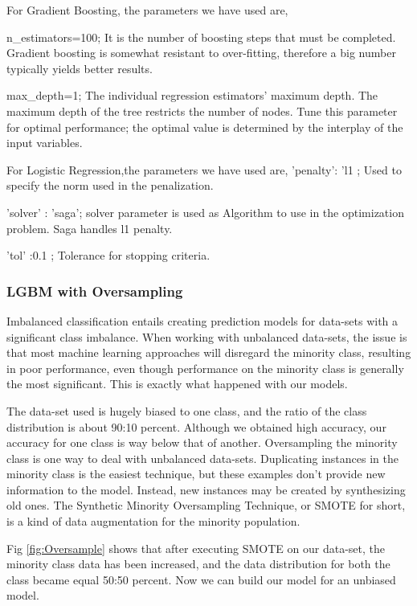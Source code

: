 \documentclass[sigconf, nonacm]{acmart}
\begin{document}
For Gradient Boosting, the parameters we have used are,

n\_estimators=100;
It is the number of boosting steps that must be completed. Gradient boosting is somewhat resistant to over-fitting, therefore a big number typically yields better results.

max\_depth=1;
The individual regression estimators' maximum depth. The maximum depth of the tree restricts the number of nodes. Tune this parameter for optimal performance; the optimal value is determined by the interplay of the input variables.

For Logistic Regression,the parameters we have used are,
'penalty': 'l1 ; Used to specify the norm used in the penalization.


'solver' : 'saga'; solver parameter is used as Algorithm to use in the optimization problem. Saga handles l1 penalty.


'tol' :0.1 ; Tolerance for stopping criteria.

	 
\subsubsection{LGBM with Oversampling} \label{subsubsec:lgb_smote}
	 
Imbalanced classification entails creating prediction models for data-sets with a significant class imbalance. When working with unbalanced data-sets, the issue is that most machine learning approaches will disregard the minority class, resulting in poor performance, even though performance on the minority class is generally the most significant. This is exactly what happened with our models.

The data-set used is hugely biased to one class, and the ratio of the class distribution is about 90:10 percent. Although we obtained high accuracy, our accuracy for one class is way below that of another. Oversampling the minority class is one way to deal with unbalanced data-sets. Duplicating instances in the minority class is the easiest technique, but these examples don't provide new information to the model. Instead, new instances may be created by synthesizing old ones. The Synthetic Minority Oversampling Technique, or SMOTE for short, is a kind of data augmentation for the minority population.


Fig \ref{fig:Oversample}  shows that after executing SMOTE on our data-set, the minority class data has been increased, and the data distribution for both the class became equal 50:50 percent. Now we can build our model for an unbiased model.	 
\end{document}
